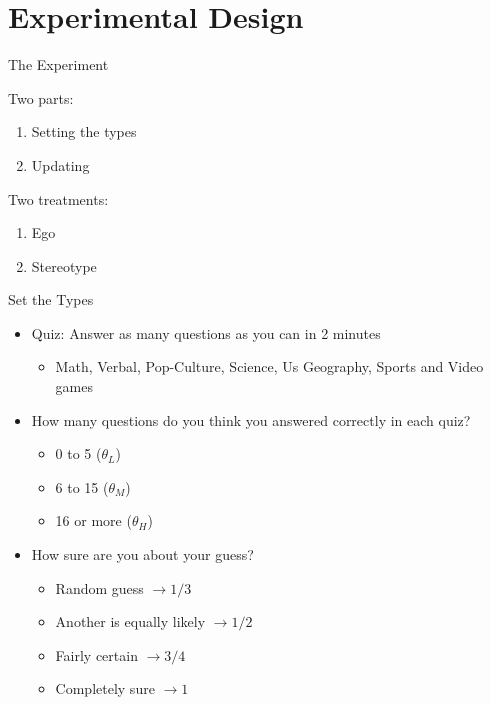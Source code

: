 \documentclass[aspectratio=169]{beamer}
\begin{document}
\section*{Experimental Design}

\begin{frame}{The Experiment}

    Two parts:\\
    \begin{enumerate}
        \item Setting the types
        \item Updating
    \end{enumerate}
    \bigskip
    Two treatments:\\
    \begin{enumerate}
        \item Ego
        \item Stereotype
    \end{enumerate}
\end{frame}

\begin{frame}{Set the Types}
    \bigskip
    \begin{itemize}
        \item Quiz: Answer as many questions as you can in 2 minutes\\
        \begin{itemize}
            \item Math, Verbal, Pop-Culture, Science, Us Geography, Sports and Video games\\
        \end{itemize}
        \bigskip

        \item How many questions do you think you answered correctly in each quiz?\\
        \begin{itemize}
            \item 0 to 5 ($\theta_L$)
            \item 6 to 15 ($\theta_M$)
            \item 16 or more ($\theta_H$)
        \end{itemize}
        \item How sure are you about your guess?
        \begin{itemize}
            \item Random guess $\to 1/3$
            \item Another is equally likely $\to 1/2$
            \item Fairly certain $\to 3/4$
            \item Completely sure $\to 1$
        \end{itemize}
    \end{itemize}

\end{frame}
\end{document}
